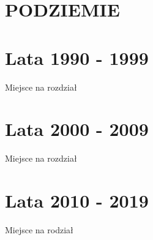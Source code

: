 \documentclass[
]{book}
\begin{document}
\hypertarget{podziemie}{%
\chapter{PODZIEMIE}\label{podziemie}}

\hypertarget{lata-1990---1999}{%
\chapter{Lata 1990 - 1999}\label{lata-1990---1999}}

Miejsce na rozdział

\hypertarget{lata-2000---2009}{%
\chapter{Lata 2000 - 2009}\label{lata-2000---2009}}

Miejsce na rozdział

\hypertarget{lata-2010---2019}{%
\chapter{Lata 2010 - 2019}\label{lata-2010---2019}}

Miejsce na rodział

  
\end{document}
